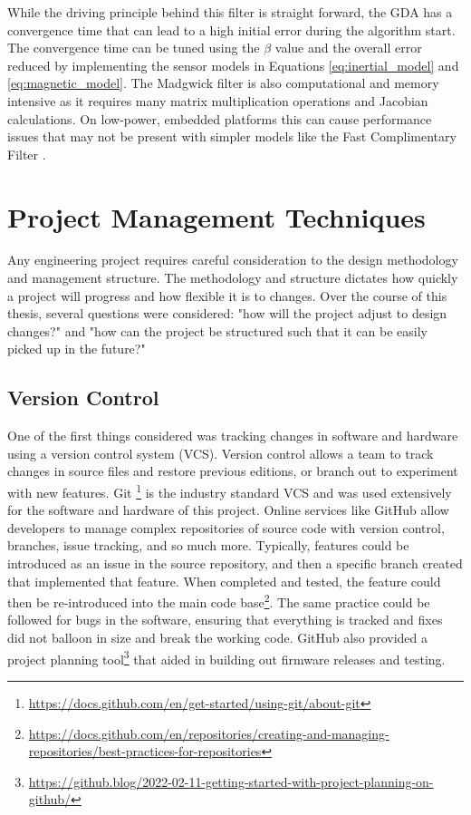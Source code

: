 While the driving principle behind this filter is straight forward, the GDA has a convergence time that can lead to a high initial error during the algorithm start.
The convergence time can be tuned using the $\beta$ value and the overall error reduced by implementing the sensor models in Equations \ref{eq:inertial_model} and \ref{eq:magnetic_model}.
The Madgwick filter is also computational and memory intensive as it requires many matrix multiplication operations and Jacobian calculations.
On low-power, embedded platforms this can cause performance issues that may not be present with simpler models like the Fast Complimentary Filter \cite{FCF:2016}.

\section{Project Management Techniques} 
Any engineering project requires careful consideration to the design methodology and management structure.
The methodology and structure dictates how quickly a project will progress and how flexible it is to changes.
Over the course of this thesis, several questions were considered: "how will the project adjust to design changes?" and "how can the project be structured such that it can be easily picked up in the future?"

\subsection{Version Control} 
One of the first things considered was tracking changes in software and hardware using a version control system (VCS).
Version control allows a team to track changes in source files and restore previous editions, or branch out to experiment with new features.
Git \footnote{\url{https://docs.github.com/en/get-started/using-git/about-git}} is the industry standard VCS and was used extensively for the software and hardware of this project.
Online services like GitHub allow developers to manage complex repositories of source code with version control, branches, issue tracking, and so much more.
Typically, features could be introduced as an issue in the source repository, and then a specific branch created that implemented that feature.
When completed and tested, the feature could then be re-introduced into the main code base\footnote
{\url{https://docs.github.com/en/repositories/creating-and-managing-repositories/best-practices-for-repositories}}.
The same practice could be followed for bugs in the software, ensuring that everything is tracked and fixes did not balloon in size and break the working code.
GitHub also provided a project planning tool\footnote{\url{https://github.blog/2022-02-11-getting-started-with-project-planning-on-github/}} that aided in building out firmware releases and testing.

